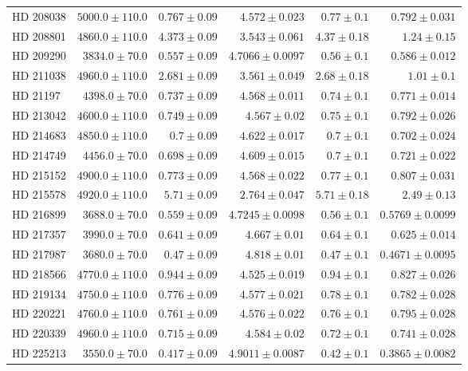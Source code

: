 \begin{longtable*}{lrrrrr}
HD 208038 & $5000.0\pm 110.0$ & $0.767\pm 0.09$ & $4.572\pm 0.023$ & $0.77\pm 0.1$ & $0.792\pm 0.031$ \\ 
HD 208801 & $4860.0\pm 110.0$ & $4.373\pm 0.09$ & $3.543\pm 0.061$ & $4.37\pm 0.18$ & $1.24\pm 0.15$ \\ 
HD 209290 & $3834.0\pm 70.0$ & $0.557\pm 0.09$ & $4.7066\pm 0.0097$ & $0.56\pm 0.1$ & $0.586\pm 0.012$ \\ 
HD 211038 & $4960.0\pm 110.0$ & $2.681\pm 0.09$ & $3.561\pm 0.049$ & $2.68\pm 0.18$ & $1.01\pm 0.1$ \\ 
HD 21197 & $4398.0\pm 70.0$ & $0.737\pm 0.09$ & $4.568\pm 0.011$ & $0.74\pm 0.1$ & $0.771\pm 0.014$ \\ 
HD 213042 & $4600.0\pm 110.0$ & $0.749\pm 0.09$ & $4.567\pm 0.02$ & $0.75\pm 0.1$ & $0.792\pm 0.026$ \\ 
HD 214683 & $4850.0\pm 110.0$ & $0.7\pm 0.09$ & $4.622\pm 0.017$ & $0.7\pm 0.1$ & $0.702\pm 0.024$ \\ 
HD 214749 & $4456.0\pm 70.0$ & $0.698\pm 0.09$ & $4.609\pm 0.015$ & $0.7\pm 0.1$ & $0.721\pm 0.022$ \\ 
HD 215152 & $4900.0\pm 110.0$ & $0.773\pm 0.09$ & $4.568\pm 0.022$ & $0.77\pm 0.1$ & $0.807\pm 0.031$ \\ 
HD 215578 & $4920.0\pm 110.0$ & $5.71\pm 0.09$ & $2.764\pm 0.047$ & $5.71\pm 0.18$ & $2.49\pm 0.13$ \\ 
HD 216899 & $3688.0\pm 70.0$ & $0.559\pm 0.09$ & $4.7245\pm 0.0098$ & $0.56\pm 0.1$ & $0.5769\pm 0.0099$ \\ 
HD 217357 & $3990.0\pm 70.0$ & $0.641\pm 0.09$ & $4.667\pm 0.01$ & $0.64\pm 0.1$ & $0.625\pm 0.014$ \\ 
HD 217987 & $3680.0\pm 70.0$ & $0.47\pm 0.09$ & $4.818\pm 0.01$ & $0.47\pm 0.1$ & $0.4671\pm 0.0095$ \\ 
HD 218566 & $4770.0\pm 110.0$ & $0.944\pm 0.09$ & $4.525\pm 0.019$ & $0.94\pm 0.1$ & $0.827\pm 0.026$ \\ 
HD 219134 & $4750.0\pm 110.0$ & $0.776\pm 0.09$ & $4.577\pm 0.021$ & $0.78\pm 0.1$ & $0.782\pm 0.028$ \\ 
HD 220221 & $4760.0\pm 110.0$ & $0.761\pm 0.09$ & $4.576\pm 0.022$ & $0.76\pm 0.1$ & $0.795\pm 0.028$ \\ 
HD 220339 & $4960.0\pm 110.0$ & $0.715\pm 0.09$ & $4.584\pm 0.02$ & $0.72\pm 0.1$ & $0.741\pm 0.028$ \\ 
HD 225213 & $3550.0\pm 70.0$ & $0.417\pm 0.09$ & $4.9011\pm 0.0087$ & $0.42\pm 0.1$ & $0.3865\pm 0.0082$ \\ 

\end{longtable*}
